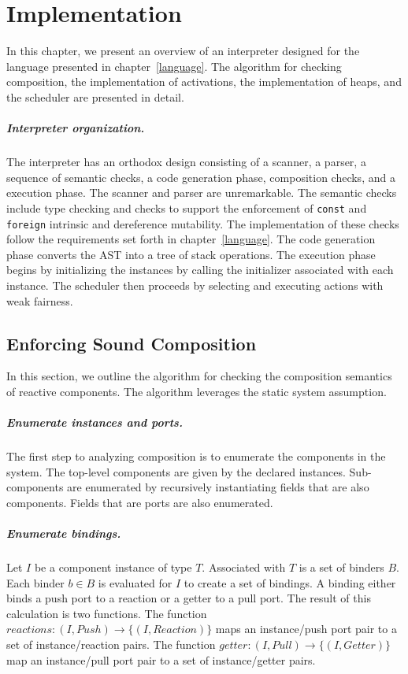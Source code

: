 \chapter{Implementation \label{implementation}}

In this chapter, we present an overview of an interpreter designed for the language presented in chapter~\ref{language}.
The algorithm for checking composition, the implementation of activations, the implementation of heaps, and the scheduler are presented in detail.

\paragraph{Interpreter organization.}
The interpreter has an orthodox design consisting of a scanner, a parser, a sequence of semantic checks, a code generation phase, composition checks, and a execution phase.
The scanner and parser are unremarkable.
The semantic checks include type checking and checks to support the enforcement of \verb+const+ and \verb+foreign+ intrinsic and dereference mutability.
The implementation of these checks follow the requirements set forth in chapter~\ref{language}.
The code generation phase converts the AST into a tree of stack operations.
The execution phase begins by initializing the instances by calling the initializer associated with each instance.
The scheduler then proceeds by selecting and executing actions with weak fairness.

\section{Enforcing Sound Composition}

In this section, we outline the algorithm for checking the composition semantics of reactive components.
The algorithm leverages the static system assumption.

\paragraph{Enumerate instances and ports.}
The first step to analyzing composition is to enumerate the components in the system.
The top-level components are given by the declared instances.
Sub-components are enumerated by recursively instantiating fields that are also components.
Fields that are ports are also enumerated.

\paragraph{Enumerate bindings.}
Let $I$ be a component instance of type $T$.
Associated with $T$ is a set of binders $B$.
Each binder $b \in B$ is evaluated for $I$ to create a set of bindings.
A binding either binds a push port to a reaction or a getter to a pull port.
The result of this calculation is two functions.
The function $reactions: (I,Push) \to \{(I,Reaction)\}$ maps an instance/push port pair to a set of instance/reaction pairs.
The function $getter: (I,Pull) \to \{(I,Getter)\}$ map an instance/pull port pair to a set of instance/getter pairs.

